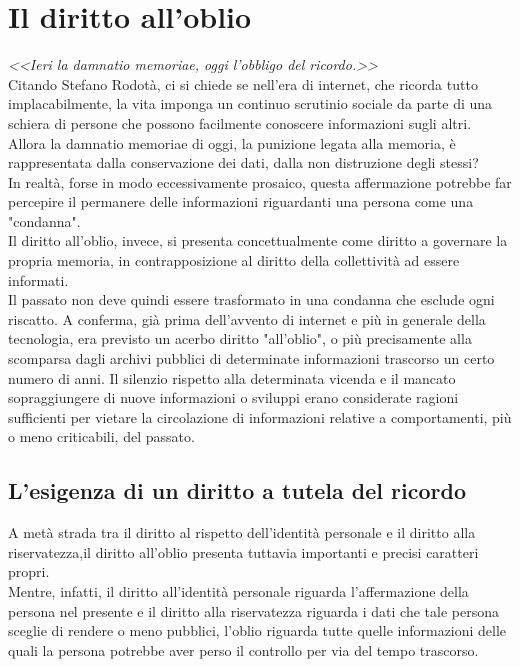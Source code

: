 \section{Il diritto all'oblio}
\textit{<<Ieri la damnatio memoriae, oggi  l’obbligo del ricordo.>>} 
\\Citando Stefano Rodotà, ci si chiede se nell'era di internet, che ricorda tutto implacabilmente, la vita imponga un continuo scrutinio sociale da parte di una  schiera di persone che possono facilmente conoscere informazioni sugli altri.
\\Allora la damnatio memoriae di oggi, la punizione legata alla memoria, è rappresentata dalla conservazione dei dati, dalla non distruzione degli stessi?
\\In realtà, forse in modo eccessivamente prosaico, questa affermazione potrebbe far percepire il permanere delle informazioni riguardanti una persona come una "condanna".
\\Il diritto all'oblio, invece, si presenta concettualmente come diritto a governare la propria memoria, in contrapposizione al diritto della collettività ad essere informati.
\\Il passato non deve quindi essere trasformato in una condanna che esclude ogni riscatto. A conferma, già prima dell'avvento di internet e più in generale della tecnologia, era previsto un acerbo diritto "all'oblio", o più precisamente alla scomparsa dagli archivi pubblici di determinate informazioni trascorso un certo numero di anni. Il silenzio rispetto alla determinata vicenda e il mancato sopraggiungere di nuove informazioni o sviluppi erano considerate ragioni sufficienti per vietare la circolazione di informazioni relative a comportamenti, più o meno criticabili, del passato. 

\subsection{L'esigenza di un diritto a tutela del ricordo}
A metà strada tra il diritto al rispetto dell'identità personale e il diritto alla riservatezza,il diritto all'oblio presenta tuttavia importanti e precisi caratteri propri.
\\Mentre, infatti, il diritto all'identità personale riguarda l'affermazione della persona nel presente e il diritto alla riservatezza riguarda i dati che tale persona sceglie di rendere o meno pubblici, l'oblio riguarda tutte quelle informazioni delle quali la persona potrebbe aver perso il controllo per via del tempo trascorso.
